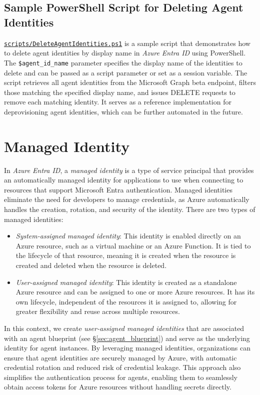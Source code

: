 \documentclass[9pt]{extarticle}%
\begin{document}
\subsection{Sample PowerShell Script for Deleting Agent Identities}%
\href{https://github.com/dennisseah/agent-identity/blob/main/scripts/DeleteAgentIdentities.ps1}{\texttt{scripts/DeleteAgentIdentities.ps1}} is a sample script that demonstrates how to delete agent identities by display name in \textit{Azure Entra ID} using PowerShell. The \texttt{\$agent\_id\_name} parameter specifies the display name of the identities to delete and can be passed as a script parameter or set as a session variable. The script retrieves all agent identities from the Microsoft Graph beta endpoint, filters those matching the specified display name, and issues DELETE requests to remove each matching identity. It serves as a reference implementation for deprovisioning agent identities, which can be further automated in the future.
%
\par\vspace{\baselineskip}%
\section{Managed Identity}%
In \textit{Azure Entra ID}, a \textit{managed identity} is a type of service principal that provides an automatically managed identity for applications to use when connecting to resources that support Microsoft Entra authentication. Managed identities eliminate the need for developers to manage credentials, as Azure automatically handles the creation, rotation, and security of the identity. There are two types of managed identities:
%
\par\vspace{\baselineskip}%
\begin{itemize}[topsep=0pt]%
\item \textit{System-assigned managed identity}: This identity is enabled directly on an Azure resource, such as a virtual machine or an Azure Function. It is tied to the lifecycle of that resource, meaning it is created when the resource is created and deleted when the resource is deleted.%
\item \textit{User-assigned managed identity}: This identity is created as a standalone Azure resource and can be assigned to one or more Azure resources. It has its own lifecycle, independent of the resources it is assigned to, allowing for greater flexibility and reuse across multiple resources.%
\end{itemize}%
\vspace{\baselineskip}%
In this context, we create \textit{user-assigned managed identities} that are associated with an agent blueprint (see \S\ref{sec:agent_blueprint}) and serve as the underlying identity for agent instances. By leveraging managed identities, organizations can ensure that agent identities are securely managed by Azure, with automatic credential rotation and reduced risk of credential leakage. This approach also simplifies the authentication process for agents, enabling them to seamlessly obtain access tokens for Azure resources without handling secrets directly.
%
\par\vspace{\baselineskip}%
\end{document}
